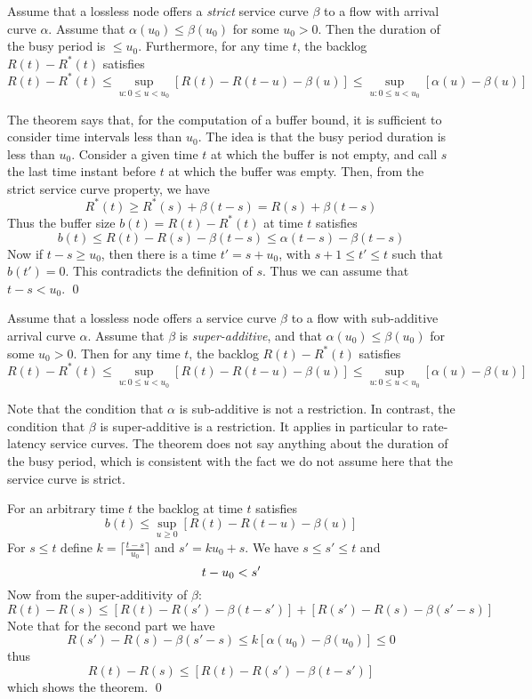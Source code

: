 \begin{theorem}%
 Assume that a lossless node offers a
\emph{strict} service curve $\beta$ to a flow with arrival curve
$\alpha$. Assume that $\alpha(u_0) \leq \beta (u_0)$ for some $u_0
>0 $. Then the duration of the busy period is $\leq u_0$.
Furthermore, for any time $t$, the backlog $R(t)-R^*(t)$ satisfies
 $$
 R(t) -R^*(t) \leq \sup_{u: 0 \leq u <u_0} \left[R(t)-R(t-u) - \beta(u)\right]
 \leq \sup_{u: 0 \leq u <u_0} \left[\alpha(u)- \beta(u)\right]
 $$
 \end{theorem}
The theorem says that, for the computation of a buffer bound, it
is sufficient to consider time intervals less than $u_0$. The idea
is that the busy period duration is less than $u_0$.
\pr
Consider a given time $t$ at which the buffer is not empty, and
call $s$ the last time instant before $t$ at which the buffer was
empty. Then, from the strict service curve property, we have
$$R^*(t) \geq R^*(s) + \beta(t-s) = R(s) + \beta(t-s)$$
Thus the buffer size $b(t)=R(t)-R^*(t)$ at time $t$ satisfies
$$b(t)\leq R(t)-R(s) - \beta(t-s) \leq \alpha(t-s)-\beta(t-s)$$
Now if $t-s  \geq u_0$, then there is a time $t' = s + u_0 $, with
$s+1 \leq t' \leq  t$ such that $b(t')=0$. This contradicts the
definition of $s$. Thus we can assume that $t-s < u_0$. \qed


\begin{theorem}%
 Assume that a lossless node offers a service
curve $\beta$ to a flow with sub-additive arrival curve $\alpha$.
Assume that $\beta$ is \emph{super-additive}, and that
$\alpha(u_0) \leq \beta (u_0)$ for some $u_0
>0 $. Then for any time $t$, the backlog $R(t)-R^*(t)$ satisfies
 $$
 R(t) -R^*(t) \leq \sup_{u: 0 \leq u <u_0} \left[R(t)-R(t-u) - \beta(u)\right]
 \leq \sup_{u: 0 \leq u <u_0} \left[\alpha(u)- \beta(u)\right]
 $$
 \end{theorem}
 Note that the condition that $\alpha$ is sub-additive is not a
 restriction. In contrast, the condition that $\beta$ is
 super-additive is a restriction. It applies in  particular to
rate-latency service curves. The theorem does not say anything
about the duration of the busy period, which is consistent with
the fact we do not assume here that the service curve is strict.

 \pr
 For an arbitrary time $t$ the backlog at time $t$ satisfies
 $$b(t) \leq \sup_{u \geq 0} \left[R(t)-R(t-u) - \beta(u)\right]
 $$
 For $s \leq t$ define $k=\lceil \frac{t-s}{u_0} \rceil$ and
 $s'=k u_0  + s$. We have $s\leq s' \leq t$ and
\begin{equation}\mylabel{eq-defu0}
t -u_0 < s'
\end{equation}
 Now from the super-additivity of $\beta$:
 $$R(t)-R(s) \leq \left[R(t)-R(s') - \beta(t-s')\right] +
 \left[R(s')-R(s) - \beta(s'-s) \right]
 $$
Note that for the second part we have
$$R(s')- R(s) - \beta(s'-s) \leq k\left[\alpha(u_0) -
\beta(u_0)\right] \leq 0
$$
thus
$$R(t)-R(s) \leq \left[R(t)-R(s') - \beta(t-s')\right]
$$
which shows the theorem. \qed


